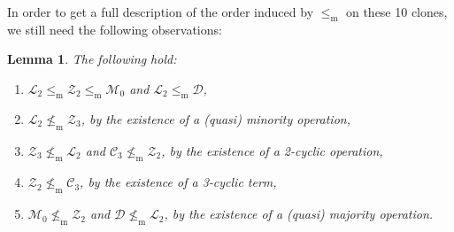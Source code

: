\documentclass[12pt]{amsart}
\newtheorem{lemma}[theorem]{Lemma}
\theoremstyle{definition}
\theoremstyle{definition}
\newcommand{\clo}[1]{\mathcal{#1}}
\newcommand{\isaminorof}{\leq_{\mathrm{m}}}
\newcommand{\notisaminorof}{\nleq_{\mathrm{m}}}
\begin{document}
In order to get a full description of the order induced by $\isaminorof$ on these 10 clones, we still need the following observations:

\begin{lemma}\label{lem:Separations}
    The following hold:
    \begin{enumerate}
        \item $\clo{L}_2 \isaminorof \clo{Z}_2  \isaminorof \clo{M}_0$ and $\clo{L}_2 \isaminorof \clo{D}$, \label{itm:inclusion}
        \item $\clo{L}_2\notisaminorof\clo{Z}_3$, by the existence of a (quasi) minority operation, \label{itm:Sep1}
        \item $\clo{Z}_3\notisaminorof\clo{L}_2$ and $\clo{C}_3\notisaminorof\clo{Z}_2$, by the existence of a 2-cyclic operation,\label{itm:Sep2}
        \item $\clo{Z}_2\notisaminorof\clo{C}_3$, by the existence of a 3-cyclic term,\label{itm:Sep3}
        \item $\clo{M}_0\notisaminorof\clo{Z}_2$ and $\clo{D}\notisaminorof\clo{L}_2$, by the existence of a (quasi) majority operation.\label{itm:Sep4}
    \end{enumerate}
\end{lemma}
\end{document}
